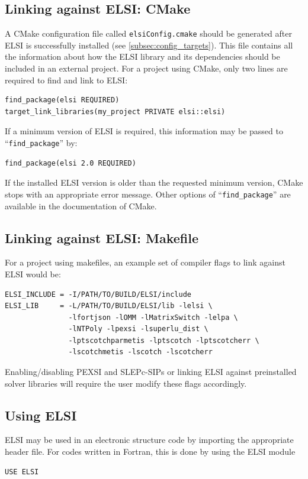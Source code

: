 \documentclass{report}
\begin{document}
\subsection{Linking against ELSI:  CMake}
\label{subsec:import_cmake}
A CMake configuration file called \texttt{elsiConfig.cmake} should be generated after ELSI is successfully installed (see \ref{subsec:config_targets}).  This file contains all the information about how the ELSI library and its dependencies should be included in an external project.  For a project using CMake, only two lines are required to find and link to ELSI:
\begin{verbatim}
find_package(elsi REQUIRED)
target_link_libraries(my_project PRIVATE elsi::elsi)
\end{verbatim}

If a minimum version of ELSI is required, this information may be passed to ``\verb+find_package+'' by:
\begin{verbatim}
find_package(elsi 2.0 REQUIRED)
\end{verbatim}

If the installed ELSI version is older than the requested minimum version, CMake stops with an appropriate error message.  Other options of ``\verb+find_package+'' are available in the documentation of CMake.\\

\subsection{Linking against ELSI:  Makefile}
\label{subsec:import_makefile}
For a project using makefiles, an example set of compiler flags to link against ELSI would be:
\begin{verbatim}
ELSI_INCLUDE = -I/PATH/TO/BUILD/ELSI/include
ELSI_LIB     = -L/PATH/TO/BUILD/ELSI/lib -lelsi \
               -lfortjson -lOMM -lMatrixSwitch -lelpa \
               -lNTPoly -lpexsi -lsuperlu_dist \
               -lptscotchparmetis -lptscotch -lptscotcherr \
               -lscotchmetis -lscotch -lscotcherr
\end{verbatim}

Enabling/disabling PEXSI and SLEPc-SIPs or linking ELSI against preinstalled solver libraries will require the user modify these flags accordingly.\\

\subsection{Using ELSI}
\label{subsec:import_use}
ELSI may be used in an electronic structure code by importing the appropriate header file.  For codes written in Fortran, this is done by using the ELSI module
\begin{verbatim}
USE ELSI
\end{verbatim}
\end{document}

